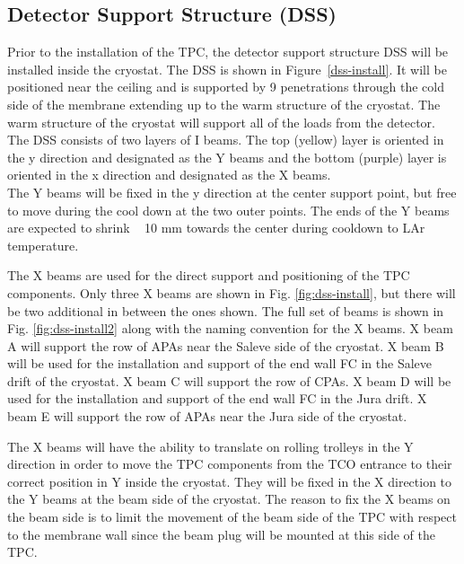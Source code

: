 \subsection{Detector Support Structure (DSS)}


Prior to the installation of the TPC, the detector support structure DSS will be installed inside the cryostat.  The DSS is shown in Figure~\ref{dss-install}.  It will be positioned near the ceiling and is supported by 9 penetrations through the cold side of the membrane extending up to the warm structure of the cryostat.  The warm structure of the cryostat will support all of the loads from the detector.  The DSS consists of two layers of I beams.  The top (yellow) layer is oriented in the y direction and designated as the Y beams and the bottom (purple) layer is oriented in the x direction and designated as the X beams. \\
The Y beams will be fixed in the y direction at the center support point, but free to move during the cool down at the two outer points.  The ends of the Y beams are expected to shrink ~ 10 mm towards the center during cooldown to LAr temperature.  

The X beams are used for the direct support and positioning of the TPC components.  Only three X beams are shown in Fig. \ref{fig:dss-install}, but there will be two additional in between the ones shown.  
The full set of beams is shown in Fig. \ref{fig:dss-install2} along with the naming convention for the X beams.
 X beam A will support the row of APAs near the Saleve side of the cryostat.  X beam B will be used for the installation and support of the end wall FC in the Saleve drift of the cryostat.  X beam C will support the row of CPAs.  X beam D will be used for the installation and support of the end wall FC in the Jura drift.  X beam E will support the row of APAs near the Jura side of the cryostat.  

The X beams will have the ability to translate on rolling trolleys in the Y direction in order to move the TPC components from the TCO entrance to their correct position in Y inside the cryostat.  They will be fixed in the X direction to the Y beams at the beam side of the cryostat.  The reason 
to fix the X beams on the beam side is to limit the movement of the beam side of the TPC with respect to the membrane wall since
the beam plug will be mounted at this side of the TPC.  


